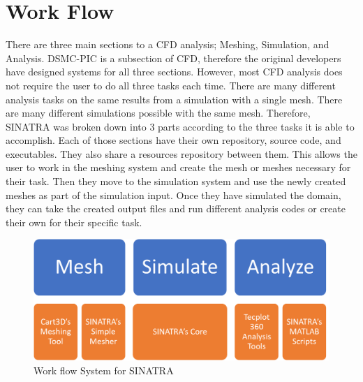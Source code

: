 \section{Work Flow}
There are three main sections to a CFD analysis; Meshing, Simulation, and Analysis. DSMC-PIC is a subsection of CFD, therefore the original developers have designed systems for all three sections. However, most  CFD analysis does not require the user to do all three tasks each time. There are many different analysis tasks on the same results from a simulation with a single mesh. There are many different simulations possible with the same mesh. Therefore, SINATRA was broken down into 3 parts according to the three tasks it is able to accomplish. Each of those sections have their own repository, source code, and executables. They also share a resources repository between them. This allows the user to work in the meshing system and create the mesh or meshes necessary for their task. Then they move to the simulation system and use the newly created meshes as part of the simulation input. Once they have simulated the domain, they can take the created output files and run different analysis codes or create their own for their specific task. 



\begin{figure}
\includegraphics[width=.95\textwidth]{figures/UserWorkFlow.png}
\centering
\caption{Work flow System for SINATRA}
\label{fig:UserWorkFlow}
\end{figure}

